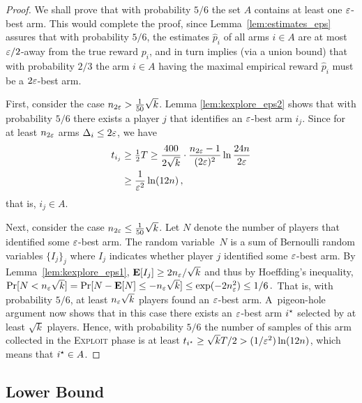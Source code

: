 \documentclass{article} %
\newcommand{\phat}{\hat{p}}
\begin{document}
\begin{proof}
We shall prove that with probability $5/6$ the set $A$ contains at least one $\varepsilon$-best arm.
This would complete the proof, since Lemma~\ref{lem:estimates_eps} assures that with probability $5/6$, the estimates $\phat_i$ of all arms $i \in A$ are at most $\varepsilon/2$-away from the true reward $p_i$, and in turn implies (via a union bound) that with probability $2/3$ the arm $i \in A$ having the maximal empirical reward $\phat_i$ must be a $2\varepsilon$-best arm.

First, consider the case $n_{2\varepsilon} > \tfrac{1}{50}\sqrt{k}$.
Lemma \ref{lem:kexplore_eps2} shows that with probability $5/6$ there exists a player $j$ that identifies an $\varepsilon$-best arm $i_j$.
Since for at least $n_{2\varepsilon}$ arms $\Delta_i \le 2\varepsilon$, we have
\begin{align*}
	t_{i_j} 
	&\ge \tfrac{1}{2} T
	\ge \frac{400}{2\sqrt{k}} \cdot \frac{n_{2\varepsilon}-1}{(2\varepsilon)^2} \ln \frac {24n}{2\varepsilon} \\
	&\ge \frac{1}{\varepsilon^2} \ln (12n) \,,
\end{align*}
that is, $i_j \in A$.

Next, consider the case $n_{2\varepsilon} \le \tfrac{1}{50}\sqrt{k}$.
Let $N$ denote the number of players that identified some $\varepsilon$-best arm.
The random variable~$N$ is a sum of Bernoulli random variables $\{I_j\}_j$ where $I_j$ indicates whether player $j$ identified some $\varepsilon$-best arm. By Lemma~\ref{lem:kexplore_eps1}, $\mathbf{E}[I_j]\geq 2 n_{\varepsilon} / \sqrt{k}$ and thus by Hoeffding's inequality,
$
	\Pr[ N < n_{\varepsilon} \sqrt{k} ] 
	= \Pr[ N-\mathbf{E}[N] \le - n_\varepsilon \sqrt{k} ]
	\le \exp(-2 n_{\varepsilon}^2)
	\le 1/6 \,.
$
That is, with probability $5/6$, at least $n_{\varepsilon} \sqrt{k}$ players found an $\varepsilon$-best arm. 
A~pigeon-hole argument now shows that in this case there exists an $\varepsilon$-best arm $i^\star$ selected by at least $\sqrt{k}$ players.
Hence, with probability $5/6$ the number of samples of this arm collected in the \textsc{Exploit} phase is at least $t_{i^\star} \ge \sqrt{k} T/2 > (1/\varepsilon^2) \ln(12n)$, which means that $i^\star \in A$.
\end{proof}





\subsection{Lower Bound} \label{sec:lower bound}
\end{document}
